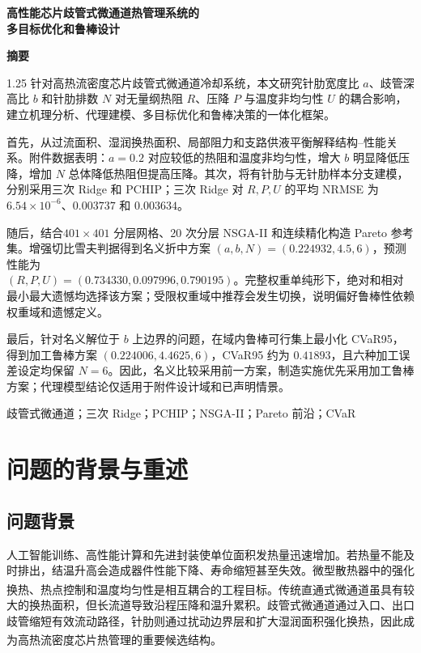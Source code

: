 \documentclass[12pt,a4paper]{article}
\newcommand{\upcite}[1]{\textsuperscript{\cite{#1}}}
\newcommand{\abskey}[1]{{\heiti\boldmath #1}}
\begin{document}
\begin{center}
\vspace*{1.2cm}
{\linespread{1.8}\selectfont\Huge\bfseries 高性能芯片歧管式微通道热管理系统的\\多目标优化和鲁棒设计}
\end{center}
\vspace{0.8cm}
\begin{center}\textbf{\LARGE 摘\quad 要}\end{center}
\vspace{0.45cm}
\begin{spacing}{1.25}
\justifying
\setlength{\parindent}{2em}
\setlength{\parskip}{0.25em}
针对\abskey{高热流密度芯片歧管式微通道冷却系统}，本文研究针肋宽度比 $a$、歧管深高比 $b$ 和针肋排数 $N$ 对无量纲热阻 $R$、压降 $P$ 与温度非均匀性 $U$ 的耦合影响，建立\abskey{机理分析、代理建模、多目标优化和鲁棒决策}的一体化框架。

首先，从过流面积、湿润换热面积、局部阻力和支路供液平衡解释结构--性能关系。附件数据表明：$a=0.2$ 对应较低的热阻和温度非均匀性，增大 $b$ 明显降低压降，增加 $N$ 总体降低热阻但提高压降。其次，将有针肋与无针肋样本分支建模，分别采用\abskey{三次 Ridge 和 PCHIP}；三次 Ridge 对 $R,P,U$ 的平均 NRMSE 为\abskey{$6.54\times10^{-6}$、$0.003737$ 和 $0.003634$}。

随后，结合\abskey{$401\times401$ 分层网格、20 次分层 NSGA-II 和连续精化}构造 Pareto 参考集。增强切比雪夫判据得到\abskey{名义折中方案 $(a,b,N)=(0.224932,4.5,6)$}，预测性能为\\[-0.1em]
\mbox{\abskey{$(R,P,U)=(0.734330,0.097996,0.790195)$}}。完整权重单纯形下，\abskey{绝对和相对最小最大遗憾}均选择该方案；受限权重域中推荐会发生切换，说明偏好鲁棒性依赖权重域和遗憾定义。

最后，针对名义解位于 $b$ 上边界的问题，在域内鲁棒可行集上最小化 CVaR95，得到\abskey{加工鲁棒方案 $(0.224006,4.4625,6)$}，\abskey{CVaR95 约为 $0.41893$}，且六种加工误差设定均保留 $N=6$。因此，名义比较采用前一方案，\abskey{制造实施优先采用加工鲁棒方案}；代理模型结论仅适用于附件设计域和已声明情景。
\end{spacing}

\vspace{0.3cm}
歧管式微通道；三次 Ridge；PCHIP；NSGA-II；Pareto 前沿；CVaR
\newpage

\section{问题的背景与重述}
\subsection{问题背景}
人工智能训练、高性能计算和先进封装使单位面积发热量迅速增加。若热量不能及时排出，结温升高会造成器件性能下降、寿命缩短甚至失效。微型散热器中的强化换热、热点控制和温度均匀性是相互耦合的工程目标\upcite{ref1}。传统直通式微通道虽具有较大的换热面积，但长流道导致沿程压降和温升累积。歧管式微通道通过入口、出口歧管缩短有效流动路径，针肋则通过扰动边界层和扩大湿润面积强化换热，因此成为高热流密度芯片热管理的重要候选结构\upcite{ref2}。
\end{document}
